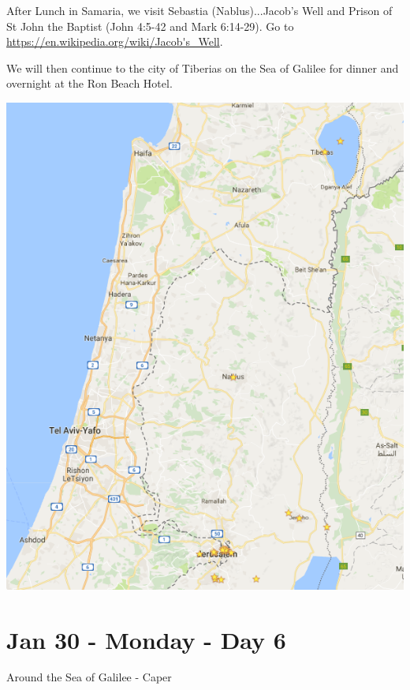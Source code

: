 \documentclass[letterpaper]{report}
\begin{document}
After Lunch in Samaria, we visit Sebastia (Nablus)...Jacob's
Well and Prison of St John the Baptist (John 4:5-42 and Mark 6:14-29). Go to
\url{https://en.wikipedia.org/wiki/Jacob's_Well}.

We will then continue to the city of Tiberias on the Sea of Galilee for dinner 
and overnight at the Ron Beach Hotel.

\includegraphics[height=\textheight]{JerusalemSeaOfGalile}



\clearpage
\section{Jan 30 - Monday - Day 6}
Around the Sea of Galilee - Caper
\end{document}
